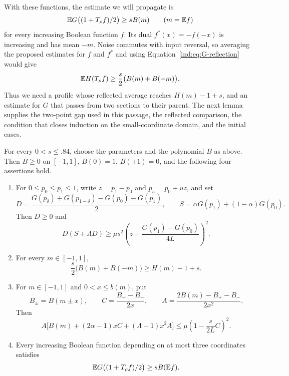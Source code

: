 With these functions, the estimate we will propagate is
\[
 \mathbb E G\bigl((1+T_\rho f)/2\bigr)\ge sB(m)
 \qquad(m=\mathbb E f)
\]
for every increasing Boolean function $f$.
Its dual $f^*(x)=-f(-x)$ is increasing and has mean $-m$.
Noise commutes with input reversal, so averaging the proposed estimates
for $f$ and $f^*$ and using Equation~\eqref{ind:eq:G-reflection} would give
\[
 \mathbb E H(T_\rho f)\ge\frac{s}{2}\bigl(B(m)+B(-m)\bigr).
\]
Thus we need a profile whose reflected average reaches $H(m)-1+s$,
and an estimate for $G$ that passes from two sections to their parent.
The next lemma supplies the two-point gap used in this passage, the
reflected comparison, the condition that closes induction on the
small-coordinate domain, and the initial cases.

\begin{lemma}\label{lem:scalar}
For every $0<s\le .84$, choose the parameters and the polynomial $B$
as above.  Then $B\ge0$ on $[-1,1]$, $B(0)=1$, $B(\pm1)=0$, and
the following four assertions hold.
\begin{enumerate}
\item For $0\le p_0\le p_1\le1$, write $z=p_1-p_0$ and
$p_u=p_0+uz$, and set
\[
 D=\frac{G(p_\delta)+G(p_{1-\delta})-G(p_0)-G(p_1)}2,
 \qquad S=\alpha G(p_1)+(1-\alpha)G(p_0).
\]
Then $D\ge0$ and
\begin{equation}\label{ind:eq:pair}
 D(S+\Lambda D)\ge
 \mu s^2\left(z-\frac{G(p_1)-G(p_0)}{4L}\right)^2.
\end{equation}
\item For every $m\in[-1,1]$,
\begin{equation}\label{ind:eq:reflection-profile}
 \frac{s}{2}\bigl(B(m)+B(-m)\bigr)\ge H(m)-1+s.
\end{equation}
\item For $m\in[-1,1]$ and $0<x\le b(m)$, put
\[
 B_\pm=B(m\pm x),\qquad
 C=\frac{B_+-B_-}{2x},\qquad
 A=\frac{2B(m)-B_+-B_-}{2x^2}.
\]
Then
\begin{equation}\label{ind:eq:profile}
 A\bigl[B(m)+(2\alpha-1)xC+(\Lambda-1)x^2A\bigr]
 \le \mu\left(1-\frac{s}{2L}C\right)^2.
\end{equation}
\item Every increasing Boolean function depending on at most three
coordinates satisfies
\begin{equation}\label{ind:eq:base}
 \mathbb E G\bigl((1+T_\rho f)/2\bigr)\ge sB(\mathbb E f).
\end{equation}
\end{enumerate}
\end{lemma}

